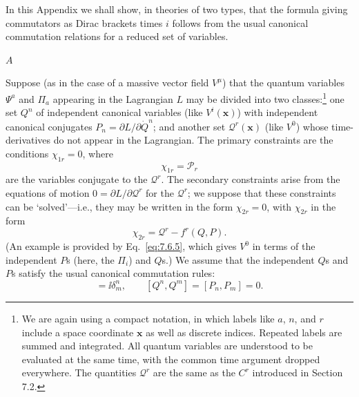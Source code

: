 

In this Appendix we shall show, in theories of two types, that the formula
giving commutators as Dirac brackets times $i$ follows from the usual
canonical commutation relations for a reduced set of variables.

\begin{center}
$A$
\end{center}

Suppose (as in the case of a massive vector field $V^\mu$) that the quantum
variables $\Psi^a$ and $\Pi_a$ appearing in the Lagrangian $L$ may be divided
into two classes:\footnote{We are again using a compact notation, in which
labels like $a$, $n$, and $r$ include a space coordinate $\mathbf{x}$ as well
as discrete indices. Repeated labels are summed and integrated. All quantum
variables are understood to be evaluated at the same time, with the common
time argument dropped everywhere. The quantities $\mathcal{Q}^r$ are the
same as the $C^r$ introduced in Section 7.2.} one set $Q^n$ of independent
canonical variables (like $V^i(\mathbf{x})$) with independent canonical
conjugates $P_n=\partial L/\partial\dot Q^n$; and another set
$\mathcal{Q}^r(\mathbf{x})$ (like $V^0$) whose time-derivatives do not appear
in the Lagrangian. The primary constraints are the conditions
$\chi_{1r}=0$, where
\begin{equation}
  \chi_{1r}=\mathcal{P}_r
  \tag{7.A.1}\label{eq:7.A.1}
\end{equation}
are the variables conjugate to the $\mathcal{Q}^r$. The secondary constraints
arise from the equations of motion $0=\partial L/\partial\mathcal{Q}^r$ for
the $\mathcal{Q}^r$; we suppose that these constraints can be `solved'---i.e.,
they may be written in the form $\chi_{2r}=0$, with $\chi_{2r}$ in the form
\begin{equation}
  \chi_{2r}=\mathcal{Q}^r-f^r(Q,P).
  \tag{7.A.2}\label{eq:7.A.2}
\end{equation}
(An example is provided by Eq.~\eqref{eq:7.6.5}, which gives $V^0$ in terms of the
independent $P$s (here, the $\Pi_i$) and $Q$s.) We assume that the independent
$Q$s and $P$s satisfy the usual canonical commutation rules:
\begin{equation}
  [Q^n,P_m]=\ii\delta^n_m,\qquad
  [Q^n,Q^m]=[P_n,P_m]=0.
  \tag{7.A.3}\label{eq:7.A.3}
\end{equation}
